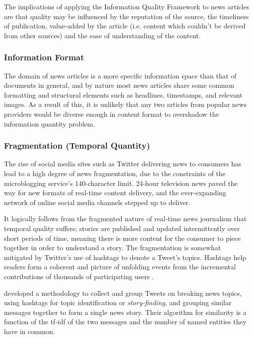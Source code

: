 The implications of applying the Information Quality Framework \citep{DataQualityInContext} to news articles are that quality may be influenced by the reputation of the source, the timeliness of publication, value-added by the article (i.e. content which couldn't be derived from other sources) and the ease of understanding of the content.

\subsubsection{Information Format}
The domain of news articles is a more specific information space than that of documents in general, and by nature most news articles share some common formatting and structural elements such as headlines, timestamps, and relevant images. As a result of this, it is unlikely that any two articles from popular news providers would be diverse enough in content format to overshadow the information quantity problem.

\subsubsection{Fragmentation (Temporal Quantity)}

The rise of social media sites such as Twitter delivering news to consumers has lead to a high degree of news fragmentation, due to the constraints of the microblogging service's 140-character limit. 24-hour television news paved the way for new formats of real-time content delivery, and the ever-expanding network of online social media channels stepped up to deliver. 

It logically follows from the fragmented nature of real-time news journalism that temporal quality suffers; stories are published and updated intermittently over short periods of time, meaning there is more content for the consumer to piece together in order to understand a story. The fragmentation is somewhat mitigated by Twitter's use of hashtags to denote a Tweet's topics. Hashtags help readers form a coherent and picture of unfolding events from the incremental contributions of thousands of participating users \citep{BlogsTwitterAndBreakingNews}.

\citet{BreakingNewsDetectionAndTrackingInTwitter} developed a methodology to collect and group Tweets on breaking news topics, using hashtags for topic identification or \textit{story-finding}, and grouping similar messages together to form a single news story. Their algorithm for similarity is a function of the tf-idf \citep{TermWeightingApproachesInAutomaticTextRetrieval} of the two messages and the number of named entities they have in common.

